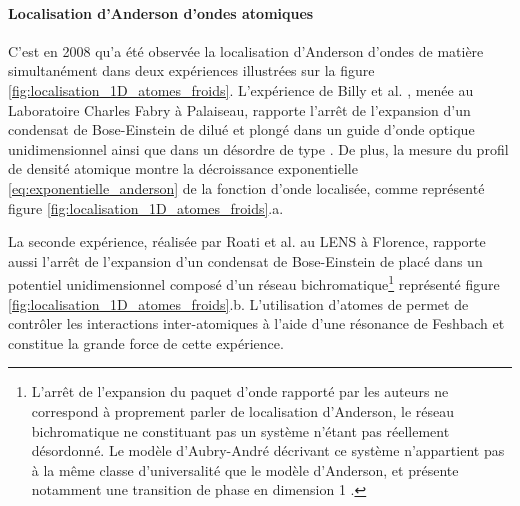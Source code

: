 \paragraph*{Localisation d'Anderson d'ondes atomiques}
C'est en 2008 qu'a été observée la localisation d'Anderson d'ondes de matière simultanément dans deux expériences illustrées sur la figure \ref{fig:localisation_1D_atomes_froids}. L'expérience de Billy et al. \citep{billy2008direct}, menée au Laboratoire Charles Fabry à Palaiseau, rapporte l'arrêt de l'expansion d'un condensat de Bose-Einstein de  dilué et plongé dans un guide d'onde optique unidimensionnel ainsi que dans un désordre de type \speckle . De plus, la mesure du profil de densité atomique montre la décroissance exponentielle \ref{eq:exponentielle_anderson} de la fonction d'onde localisée, comme représenté figure \ref{fig:localisation_1D_atomes_froids}.a. 

La seconde expérience, réalisée par Roati et al. \citep{roati2008anderson} au LENS à Florence, rapporte aussi l'arrêt de l'expansion d'un condensat de Bose-Einstein de  placé dans un potentiel unidimensionnel composé d'un réseau bichromatique\footnote{L'arrêt de l'expansion du paquet d'onde rapporté par les auteurs ne correspond à proprement parler de localisation d'Anderson, le réseau bichromatique ne constituant pas un système n'étant pas réellement désordonné. Le modèle d'Aubry-André décrivant ce système n'appartient pas à la même classe d'universalité que le modèle d'Anderson, et présente notamment une transition de phase en dimension 1 \citep{sarma1988mobility}.} représenté figure \ref{fig:localisation_1D_atomes_froids}.b. L'utilisation d'atomes de  permet de contrôler les interactions inter-atomiques à l'aide d'une résonance de Feshbach et constitue la grande force de cette expérience.

